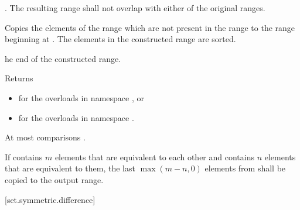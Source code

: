 \begin{itemdescr}
\pnum
\requires
{}.
The resulting range shall not overlap with either of the original ranges.

\pnum
\effects
Copies the elements of the range
which are not present in the range
to the range beginning at
.
The elements in the constructed range are sorted.

\pnum
\returns
{}he end of the
constructed range.
\begin{addedblock}
Returns
\begin{itemize}
\item {} for the overloads in namespace , or
\item {} for the overloads in
  namespace .
\end{itemize}
\end{addedblock}

\pnum
\complexity
At most
comparisons .

\pnum
\remarks
If
contains $m$
elements that are equivalent to each other and
contains $n$
elements that are equivalent to them, the last
$\max(m - n, 0)$
elements from
shall be copied to the output range.
\end{itemdescr}


[set.symmetric.difference]{}

